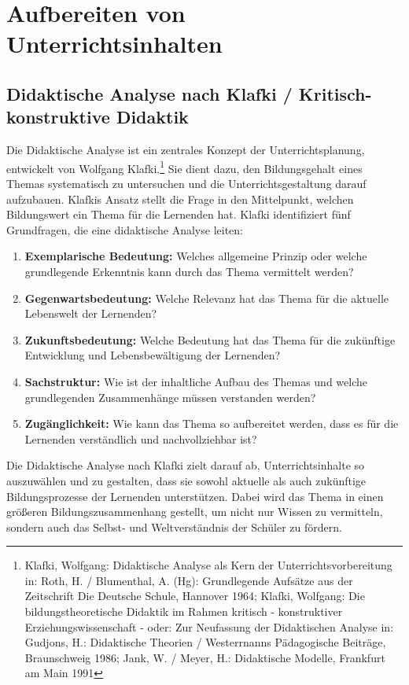 \chapter{Aufbereiten von Unterrichtsinhalten}\label{Aufbereitung}

\section{Didaktische Analyse nach Klafki / Kritisch-konstruktive Didaktik}

Die Didaktische Analyse ist ein zentrales Konzept der Unterrichtsplanung, entwickelt von Wolfgang Klafki.\footnote{Klafki, Wolfgang: Didaktische Analyse als Kern der Unterrichtsvorbereitung in: Roth, H. / Blumenthal, A. (Hg): Grundlegende Aufs\"{a}tze aus der Zeitschrift Die Deutsche Schule, Hannover 1964; Klafki, Wolfgang: Die bildungstheoretische Didaktik im Rahmen kritisch - konstruktiver Erziehungswissenschaft - oder: Zur Neufassung der Didaktischen Analyse in: Gudjons, H.: Didaktische Theorien / Westerrnanns P\"{a}dagogische Beitr\"{a}ge, Braunschweig 1986; Jank, W. / Meyer, H.: Didaktische Modelle, Frankfurt am Main 1991} Sie dient dazu, den Bildungsgehalt eines Themas systematisch zu untersuchen und die Unterrichtsgestaltung darauf aufzubauen. Klafkis Ansatz stellt die Frage in den Mittelpunkt, welchen Bildungswert ein Thema f\"{u}r die Lernenden hat.
\bip
Klafki identifiziert f\"{u}nf Grundfragen, die eine didaktische Analyse leiten:
\begin{enumerate}
\item{\textbf{Exemplarische Bedeutung:} Welches allgemeine Prinzip oder welche grundlegende Erkenntnis kann durch das Thema vermittelt werden?}
\item{\textbf{Gegenwartsbedeutung:} Welche Relevanz hat das Thema f\"{u}r die aktuelle Lebenswelt der Lernenden?}
\item{\textbf{Zukunftsbedeutung:} Welche Bedeutung hat das Thema f\"{u}r die zuk\"{u}nftige Entwicklung und Lebensbew\"{a}ltigung der Lernenden?}
\item{\textbf{Sachstruktur:} Wie ist der inhaltliche Aufbau des Themas und welche grundlegenden Zusammenh\"{a}nge m\"{u}ssen verstanden werden?}
\item{\textbf{Zug\"{a}nglichkeit:} Wie kann das Thema so aufbereitet werden, dass es f\"{u}r die Lernenden verst\"{a}ndlich und nachvollziehbar ist?}
\end{enumerate}

\bip

Die Didaktische Analyse nach Klafki zielt darauf ab, Unterrichtsinhalte so auszuw\"{a}hlen und zu gestalten, dass sie sowohl aktuelle als auch zuk\"{u}nftige Bildungsprozesse der Lernenden unterst\"{u}tzen. Dabei wird das Thema in einen gr\"{o}{\ss}eren Bildungszusammenhang gestellt, um nicht nur Wissen zu vermitteln, sondern auch das Selbst- und Weltverst\"{a}ndnis der Sch\"{u}ler zu f\"{o}rdern.

